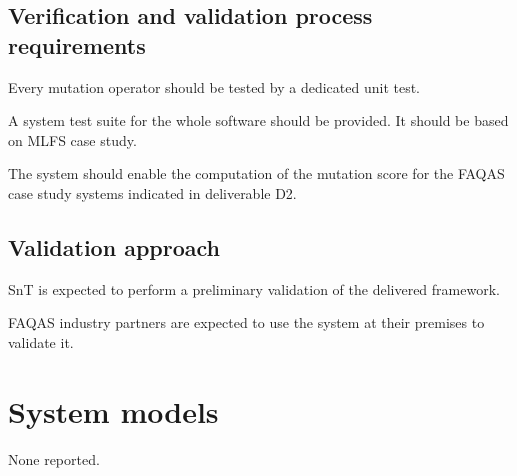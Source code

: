  \subsection{Verification and validation process requirements}
 
 \RQ{} Every mutation operator should be tested by a dedicated unit test.
 
 \RQ{} A system test suite for the whole software should be provided. It should be based on MLFS case study.
 
   \RQ{} The system should enable the computation of the mutation score for the FAQAS case study systems indicated in deliverable D2.
 
 \subsection{Validation approach}

\RQ{} SnT is expected to perform a preliminary validation of the delivered framework.

 \RQ{} FAQAS industry partners are expected to use the system at their premises to validate it.
 

%  
% 
%
% 
% 

 \section{System models}
 
 None reported.

